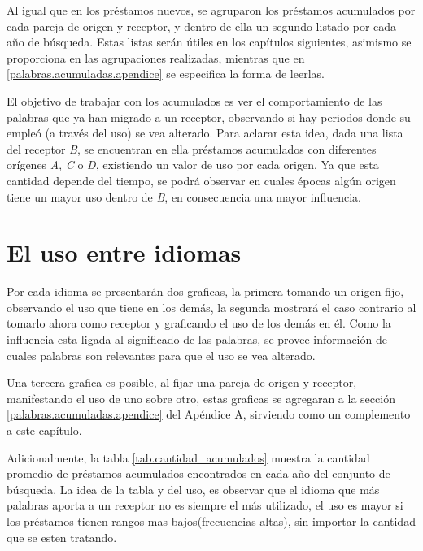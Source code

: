 Al igual que en los préstamos nuevos,  se agruparon los préstamos acumulados por cada pareja de origen y receptor,  y dentro de ella un segundo listado por cada año de búsqueda.  Estas listas serán útiles en los capítulos siguientes,  asimismo se proporciona en \cite{prestamos_acumulados} las agrupaciones realizadas, mientras que en \ref{palabras.acumuladas.apendice}  se especifica la forma de leerlas. 

El objetivo  de trabajar con los acumulados es ver el comportamiento de las palabras que ya han migrado a un receptor, observando si hay periodos donde su empleó (a través del uso) se vea alterado. Para aclarar esta idea, dada una lista del receptor \textit{B}, se encuentran en ella préstamos acumulados con diferentes orígenes \textit{A}, \textit{C} o \textit{D},  existiendo un valor de uso por cada origen. Ya que esta cantidad depende del tiempo,  se podrá observar en cuales épocas algún origen tiene un mayor uso dentro de \textit{B},  en consecuencia una mayor influencia. 

\section {El uso entre idiomas} 

Por cada idioma se presentarán dos graficas, la primera tomando un origen fijo,  observando el uso que tiene en los demás, la segunda mostrará el caso contrario al tomarlo ahora como receptor y graficando el uso de los demás en él.  Como la influencia esta ligada al significado de las palabras, se provee información de cuales palabras son relevantes para
que el uso se vea alterado. 


Una tercera grafica es posible, al fijar una pareja de origen y receptor, manifestando el uso de uno sobre otro,  estas graficas se agregaran a la sección \ref{palabras.acumuladas.apendice} del Apéndice A, sirviendo como un complemento a este capítulo. 


Adicionalmente, la tabla \ref{tab.cantidad_acumulados} muestra la cantidad promedio de préstamos acumulados encontrados en cada año del conjunto de búsqueda. La idea de la tabla y del uso, es observar que el idioma que más palabras aporta a un receptor no es siempre el más utilizado,  el uso es mayor si los préstamos tienen rangos mas bajos(frecuencias altas), sin importar la cantidad que se esten tratando. 


